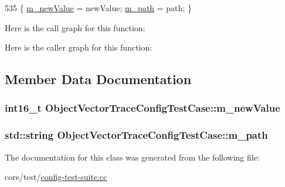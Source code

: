 \begin{DoxyCode}
535 \{ \hyperlink{classObjectVectorTraceConfigTestCase_aa09d9661bd785bbeb9db030419138e5f}{m\_newValue} = newValue; \hyperlink{classObjectVectorTraceConfigTestCase_ab52e8b427f81671e823abbbda41dea69}{m\_path} = path; \}
\end{DoxyCode}


Here is the call graph for this function\+:




Here is the caller graph for this function\+:




\subsection{Member Data Documentation}
\subsubsection[{\texorpdfstring{m\+\_\+new\+Value}{m_newValue}}]{\setlength{\rightskip}{0pt plus 5cm}int16\+\_\+t Object\+Vector\+Trace\+Config\+Test\+Case\+::m\+\_\+new\+Value\hspace{0.3cm}{\ttfamily [private]}}\hypertarget{classObjectVectorTraceConfigTestCase_aa09d9661bd785bbeb9db030419138e5f}{}\label{classObjectVectorTraceConfigTestCase_aa09d9661bd785bbeb9db030419138e5f}
\subsubsection[{\texorpdfstring{m\+\_\+path}{m_path}}]{\setlength{\rightskip}{0pt plus 5cm}std\+::string Object\+Vector\+Trace\+Config\+Test\+Case\+::m\+\_\+path\hspace{0.3cm}{\ttfamily [private]}}\hypertarget{classObjectVectorTraceConfigTestCase_ab52e8b427f81671e823abbbda41dea69}{}\label{classObjectVectorTraceConfigTestCase_ab52e8b427f81671e823abbbda41dea69}


The documentation for this class was generated from the following file\+:\begin{DoxyCompactItemize}
\item 
core/test/\hyperlink{config-test-suite_8cc}{config-\/test-\/suite.\+cc}\end{DoxyCompactItemize}
